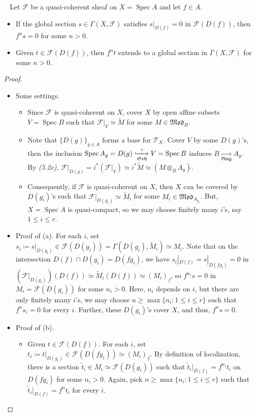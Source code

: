 \documentclass[11pt,a4paper,footinclude=true,headinclude=true]{scrbook} %
\DeclareMathOperator{\Spec}{Spec}
\newcommand{\FF}{\mathscr{F}}
\newcommand{\TT}{\mathcal{T}}
\newcommand{\Sch}{\mathfrak{Sch}}
\newcommand{\Ring}{\mathfrak{Ring}}
\newcommand{\<}{\langle}
\newcommand{\>}{\rangle}
\newcommand{\MOD}{\mathfrak{Mod}}
\newenvironment{lemma}[2][]
{\renewcommand\theinnercustomlemma{#2}\innercustomlemma[#1]
\begin{mdframed}[backgroundcolor=gray!20]\ }
{\end{mdframed}\endinnercustomprop}
\begin{document}
\begin{lemma}{5.3}
    Let $\FF$ be a quasi-coherent sheaf on $X=\Spec A$ and let $f\in A$.
    \begin{itemize}
        \item[(a)] If the global section $s\in\Gamma(X,\FF)$ satisfies $s|_{D(f)}=0$ in $\FF(D(f))$, then $f^ns=0$ for some $n>0$.
        \item[(b)] Given $t\in\FF(D(f))$, then $f^nt$ extends to a global section in $\Gamma(X,\FF)$ for some $n>0$.
    \end{itemize}
\end{lemma}
\begin{proof}\mbox{}
    \begin{itemize}
        \item[(I)] Some settings.
        \begin{itemize}
            \item Since $\FF$ is quasi-coherent on $X$, cover $X$ by open affine subsets $V=\Spec B$ such that $\FF|_V\simeq\widetilde{M}$ for some $M\in \MOD_B$.
            \item Note that $\{D(g)\}_{g\in A}$ forms a base for $\TT_X$. Cover $V$ by some $D(g)$'s, then the inclusion $\Spec A_g=D(g)\xhookrightarrow[\Sch]{i}V=\Spec B$ induces $B\xrightarrow[\Ring]{}A_g$. By \textit{(5.2e)}, $\FF|_{D(g)}=i^\ast(\FF|_V)\simeq i^\ast\widetilde{M}\simeq(M\otimes_BA_g)\widetilde{}$.
            \item Consequently, if $\FF$ is quasi-coherent on $X$, then $X$ can be covered by $D(g_i)$'s such that $\FF|_{D(g_i)}\simeq\widetilde{M}_i$ for some $M_i\in \MOD_{A_{g_i}}$. But, $X=\Spec A$ is quasi-compact, so we may choose finitely many $i$'s, say $1\leq i\leq r$.
        \end{itemize}
        \item[(II)] Proof of (a). For each $i$, set $s_i\coloneqq s|_{D(g_i)}\in\FF(D(g_i))=\Gamma(D(g_i),\widetilde{M}_i)\simeq M_i$. Note that on the intersection $D(f)\cap D(g_i)=D(fg_i)$, we have $s_i|_{D(f)}=s|_{D(fg_i)}=0$ in $(\FF|_{D(g_i)})(D(f))\simeq\widetilde{M}_i(D(f))\simeq(M_i)_f$, so $f^{n_i}s=0$ in $M_i=\FF(D(g_i))$ for some $n_i>0$. Here, $n_i$ depends on $i$, but there are only finitely many $i$'s, we may choose $n\geq\max\{n_i:1\leq i\leq r\}$ such that $f^ns_i=0$ for every $i$. Further, these $D(g_i)$'s cover $X$, and thus, $f^ns=0$.
        \item[(III)] Proof of (b). 
        \begin{itemize}
            \item Given $t\in\FF(D(f))$. For each $i$, set $t_i\coloneqq t|_{D(g_i)}\in\FF(D(fg_i))\simeq(M_i)_f$. By definition of localization, there is a section $\tilde{t}_i\in M_i\simeq\FF(D(g_i))$ such that $\tilde{t}_i|_{D(f)}=f^{n_i}t_i$ on $D(fg_i)$ for some $n_i>0$. Again, pick $n\geq\max\{n_i:1\leq i\leq r\}$ such that $\tilde{t}_i|_{D(f)}=f^nt_i$ for every $i$.

\end{itemize}
\end{itemize}
\end{proof}
\end{document}
